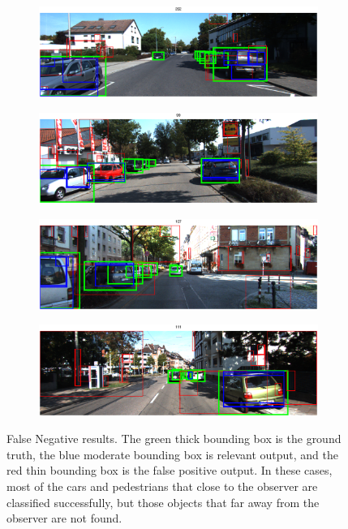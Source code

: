 \documentclass{article} %
\begin{document}
\begin{figure}[htb]
\begin{subfigure}[b]{0.5\textwidth}
    \includegraphics[width=.9\textwidth]{test-fn1.eps}
    \label{fig:test-fn1}
\end{subfigure}
\begin{subfigure}[b]{0.5\textwidth}
    \includegraphics[width=.9\textwidth]{test-fn2.eps}
    \label{fig:test-fn2}
\end{subfigure}

\begin{subfigure}[b]{0.5\textwidth}
    \includegraphics[width=.9\textwidth]{test-fn3.eps}
    \label{fig:test-fn3}
\end{subfigure}
\begin{subfigure}[b]{0.5\textwidth}
    \includegraphics[width=.9\textwidth]{test-fn4.eps}
    \label{fig:test-fn4}
\end{subfigure}
\caption{False Negative results. The green thick bounding box is the ground truth, the blue moderate bounding box is relevant output, and the red thin bounding box is the false positive output. In these cases, most of the cars and pedestrians that close to the observer are classified successfully, but those objects that far away from the observer are not found.
\label{fig:test-fn}}
\end{figure}
\end{document}

